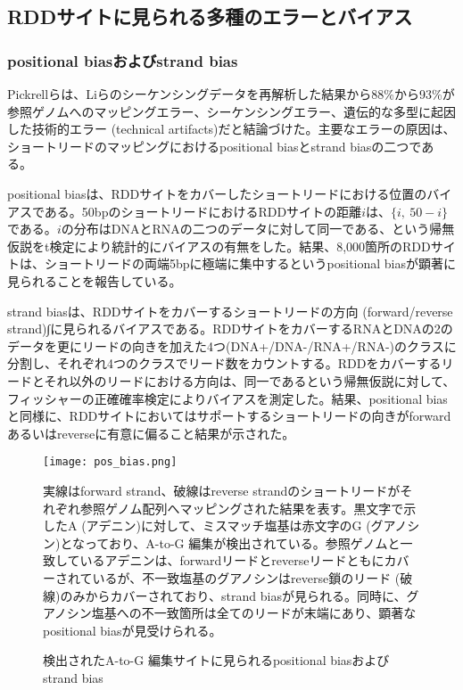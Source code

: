 \subsection{RDDサイトに見られる多種のエラーとバイアス}
\subsubsection{positional biasおよびstrand bias}
Pickrellらは、Liらのシーケンシングデータを再解析した結果から88\%から93\%が参照ゲノムへのマッピングエラー、シーケンシングエラー、遺伝的な多型に起因した技術的エラー (technical artifacts)だと結論づけた。主要なエラーの原因は、ショートリードのマッピングにおけるpositional biasとstrand biasの二つである。
\par
positional biasは、RDDサイトをカバーしたショートリードにおける位置のバイアスである。50bpのショートリードにおけるRDDサイトの距離$i$は、$\{i,\ 50-i\}$である。$i$の分布はDNAとRNAの二つのデータに対して同一である、という帰無仮説をt検定により統計的にバイアスの有無をした。結果、8,000箇所のRDDサイトは、ショートリードの両端5bpに極端に集中するというpositional biasが顕著に見られることを報告している。
\par
strand biasは、RDDサイトをカバーするショートリードの方向 (forward/reverse strand)∫に見られるバイアスである。RDDサイトをカバーするRNAとDNAの2のデータを更にリードの向きを加えた4つ(DNA+/DNA-/RNA+/RNA-)のクラスに分割し、それぞれ4つのクラスでリード数をカウントする。RDDをカバーするリードとそれ以外のリードにおける方向は、同一であるという帰無仮説に対して、フィッシャーの正確確率検定によりバイアスを測定した。結果、positional biasと同様に、RDDサイトにおいてはサポートするショートリードの向きがforwardあるいはreverseに有意に偏ること結果が示された。
\begin{figure}[!htbp]
	\begin{center}
		\texttt{[image: pos\_bias.png]}
	\end{center}
	\caption{検出されたA-to-G 編集サイトに見られるpositional biasおよびstrand bias}
	\begin{flushleft}
		\small{実線はforward strand、破線はreverse strandのショートリードがそれぞれ参照ゲノム配列へマッピングされた結果を表す。黒文字で示したA (アデニン)に対して、ミスマッチ塩基は赤文字のG (グアノシン)となっており、A-to-G 編集が検出されている。参照ゲノムと一致しているアデニンは、forwardリードとreverseリードともにカバーされているが、不一致塩基のグアノシンはreverse鎖のリード (破線)のみからカバーされており、strand biasが見られる。同時に、グアノシン塩基への不一致箇所は全てのリードが末端にあり、顕著なpositional biasが見受けられる。}
	\end{flushleft}
	\label{fig:positional_bias}
\end{figure}

